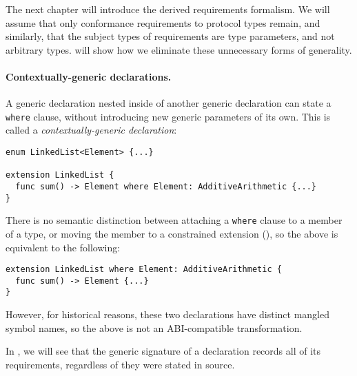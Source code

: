 \documentclass[../generics]{subfiles}
\begin{document}
The next chapter will introduce the derived requirements formalism. We will assume that only conformance requirements to protocol types remain, and similarly, that the subject types of requirements are type parameters, and not arbitrary types.  will show how we eliminate these unnecessary forms of generality.

\paragraph{Contextually-generic declarations.} A generic declaration nested inside of another generic declaration can state a \texttt{where} clause, without introducing new generic parameters of its own. This is called a \emph{contextually-generic declaration}:
\begin{Verbatim}
enum LinkedList<Element> {...}

extension LinkedList {
  func sum() -> Element where Element: AdditiveArithmetic {...}
}
\end{Verbatim}
There is no semantic distinction between attaching a \texttt{where} clause to a member of a type, or moving the member to a constrained extension (), so the above is equivalent to the following:
\begin{Verbatim}
extension LinkedList where Element: AdditiveArithmetic {
  func sum() -> Element {...}
}
\end{Verbatim}
However, for historical reasons, these two declarations have distinct mangled symbol names, so the above is not an ABI-compatible transformation.

\medskip

In , we will see that the generic signature of a declaration records all of its requirements, regardless of they were stated in source.
\end{document}
